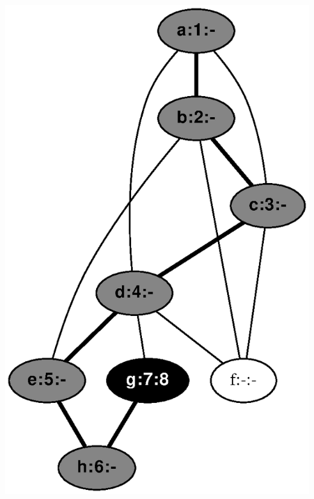 \documentclass{article}
\begin{document}
\includegraphics[height=.3\textheight]{dfs_undirected_classroom_08.eps}
\vspace{1em}
\end{document}
